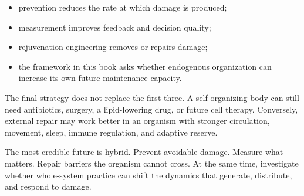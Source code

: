 \begin{itemize}
\tightlist
\item
  prevention reduces the rate at which damage is produced;
\item
  measurement improves feedback and decision quality;
\item
  rejuvenation engineering removes or repairs damage;
\item
  the framework in this book asks whether endogenous organization can increase its own future maintenance capacity.
\end{itemize}

The final strategy does not replace the first three. A self-organizing body can still need antibiotics, surgery, a lipid-lowering drug, or future cell therapy. Conversely, external repair may work better in an organism with stronger circulation, movement, sleep, immune regulation, and adaptive reserve.

The most credible future is hybrid. Prevent avoidable damage. Measure what matters. Repair barriers the organism cannot cross. At the same time, investigate whether whole-system practice can shift the dynamics that generate, distribute, and respond to damage.
